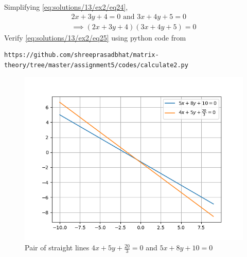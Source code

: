Simplifying \eqref{eq:solutions/13/ex2/eq24},
\begin{align}
	\label{eq:solutions/13/ex2/eq26}2x + 3y + 4 = 0 \text{ and } 3x + 4y + 5 = 0\\
	\label{eq:solutions/13/ex2/eq27}\implies (2x + 3y + 4)(3x + 4y + 5) = 0
\end{align}
Verify  \eqref{eq:solutions/13/ex2/eq25} using python code from
\begin{lstlisting}
https://github.com/shreeprasadbhat/matrix-theory/tree/master/assignment5/codes/calculate2.py
\end{lstlisting}
\begin{figure}[ht!]
	\centering
	\includegraphics[width=\columnwidth]{./solutions/13/ex2/fig/figure_2.png}
	\caption{Pair of straight lines $4x + 5y + \frac{20}{3} = 0$ and $5x + 8y + 10 = 0$}
	\label{eq:solutions/13/ex2/fig:figure2}
\end{figure}

